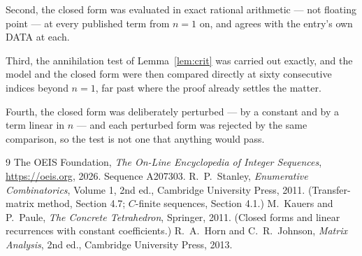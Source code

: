 \documentclass[11pt,a4paper]{article}
\theoremstyle{plain}
\theoremstyle{definition}
\begin{document}
Second, the closed form was evaluated in exact rational arithmetic --- not floating point ---
at every published term from $n=1$ on, and agrees with the entry's own DATA at each.

Third, the annihilation test of Lemma~\ref{lem:crit} was carried out exactly, and the model
and the closed form were then compared directly at sixty consecutive indices beyond
$n=1$, far past where the proof already settles the matter.

Fourth, the closed form was deliberately perturbed --- by a constant and by a term linear in
$n$ --- and each perturbed form was rejected by the same comparison, so the test is not one
that anything would pass.

\begin{thebibliography}{9}
 The OEIS Foundation, \emph{The On-Line Encyclopedia of Integer
Sequences}, \url{https://oeis.org}, 2026. Sequence A207303.
 R.~P.~Stanley, \emph{Enumerative Combinatorics}, Volume 1, 2nd ed.,
Cambridge University Press, 2011. (Transfer-matrix method, Section 4.7; $C$-finite sequences,
Section 4.1.)
 M.~Kauers and P.~Paule, \emph{The Concrete Tetrahedron}, Springer, 2011.
(Closed forms and linear recurrences with constant coefficients.)
 R.~A.~Horn and C.~R.~Johnson, \emph{Matrix Analysis}, 2nd ed., Cambridge
University Press, 2013.
\end{thebibliography}
\end{document}
